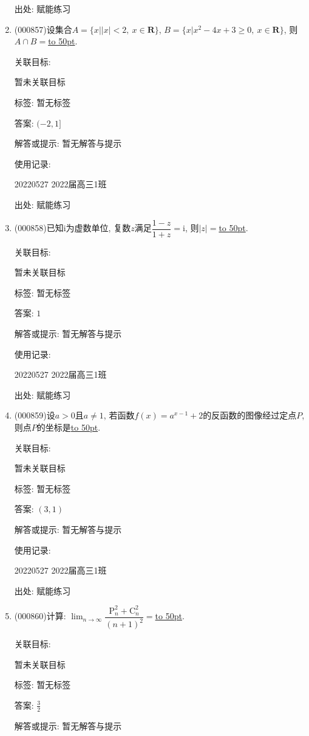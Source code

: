 \documentclass[10pt,a4paper]{article}
\newcommand{\blank}[1]{\underline{\hbox to #1pt{}}}
\begin{document}
\begin{enumerate}[1.]
出处: 赋能练习
\item { (000857)}设集合$A=\{x||x|<2,\ x\in \mathbf{R}\}$, $B=\{x|x^2-4x+3\ge 0, \ x\in \mathbf{R}\}$, 则$A\cap B=$\blank{50}.


关联目标:

暂未关联目标



标签: 暂无标签

答案: $(-2,1]$

解答或提示: 暂无解答与提示

使用记录:

20220527	2022届高三1班	


出处: 赋能练习
\item { (000858)}已知$\mathrm{i}$为虚数单位, 复数$z$满足$\dfrac{1-z}{1+z}=\mathrm{i}$, 则$|z|=$\blank{50}.


关联目标:

暂未关联目标



标签: 暂无标签

答案: $1$

解答或提示: 暂无解答与提示

使用记录:

20220527	2022届高三1班	


出处: 赋能练习
\item { (000859)}设$a>0$且$a\ne 1$, 若函数$f(x)=a^{x-1}+2$的反函数的图像经过定点$P$, 则点$P$的坐标是\blank{50}.


关联目标:

暂未关联目标



标签: 暂无标签

答案: $(3,1)$

解答或提示: 暂无解答与提示

使用记录:

20220527	2022届高三1班	


出处: 赋能练习
\item { (000860)}计算: $\displaystyle\lim_{n\to\infty}\dfrac{\mathrm{P}_n^2+\mathrm{C}_n^2}{(n+1)^2}=$\blank{50}.


关联目标:

暂未关联目标



标签: 暂无标签

答案: $\frac 32$

解答或提示: 暂无解答与提示


\end{enumerate}
\end{document}
